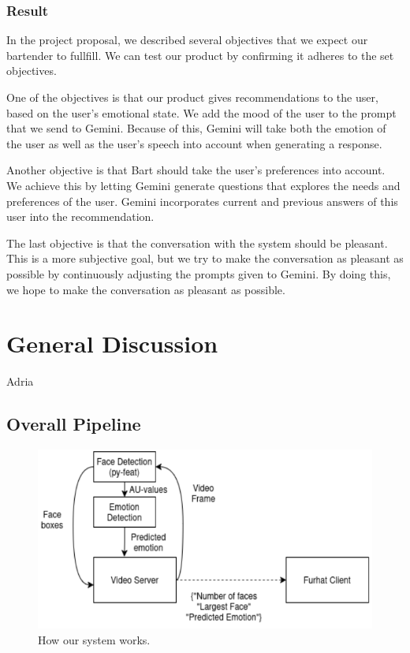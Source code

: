 \documentclass[conference]{IEEEtran}
\begin{document}
\subsubsection{Result}
In the project proposal, we described several objectives that we expect our bartender to fullfill.
We can test our product by confirming it adheres to the set objectives.

One of the objectives is that our product gives recommendations to the user, based on the user's emotional state.
We add the mood of the user to the prompt that we send to Gemini.
Because of this, Gemini will take both the emotion of the user as well as the user's speech into account when generating a response.

Another objective is that Bart should take the user's preferences into account. 
We achieve this by letting Gemini generate questions that explores the needs and preferences of the user.
Gemini incorporates current and previous answers of this user into the recommendation.

The last objective is that the conversation with the system should be pleasant.
This is a more subjective goal, but we try to make the conversation as pleasant as possible by continuously adjusting the prompts given to Gemini.
By doing this, we hope to make the conversation as pleasant as possible.


\section{General Discussion}
Adria\\

\subsection{Overall Pipeline}
\begin{figure}[!h]
    \includegraphics[width=\linewidth]{pipeline.png}
    \caption{How our system works.}
    \label{fig:pipeline}
  \end{figure}
\end{document}
